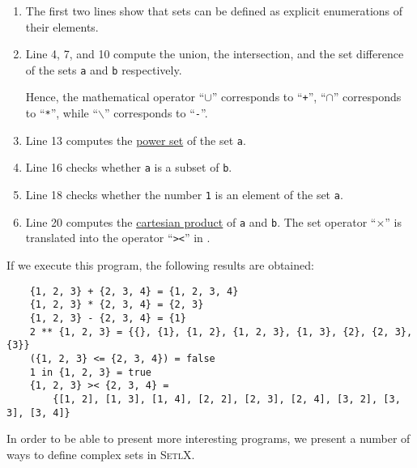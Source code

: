 \begin{enumerate}
\item The first two lines show that sets can be defined as explicit enumerations of their elements.
\item Line 4, 7, and 10 compute the union, the intersection, and the set difference of the sets
      \texttt{a} and \texttt{b} respectively.

      Hence, the mathematical operator ``$\cup$'' corresponds to ``\texttt{+}'', ``$\cap$''
      corresponds to ``\texttt{*}'', while ``$\backslash$'' corresponds to ``\texttt{-}''.
\item Line 13 computes the \href{https://en.wikipedia.org/wiki/Power_set}{power set} of the set
      \texttt{a}.
\item Line 16 checks whether \texttt{a} is a subset of \texttt{b}.
\item Line 18 checks whether the number \texttt{1} is an element of the set \texttt{a}.
\item Line 20 computes the \href{https://en.wikipedia.org/wiki/Cartesian_product}{cartesian product}
      of \texttt{a} and \texttt{b}.  The set operator ``$\times$'' is translated into the operator
      ``\texttt{><}'' in \setl.
\end{enumerate}
If we execute this program, the following results are obtained:
\begin{verbatim}
    {1, 2, 3} + {2, 3, 4} = {1, 2, 3, 4}
    {1, 2, 3} * {2, 3, 4} = {2, 3}
    {1, 2, 3} - {2, 3, 4} = {1}
    2 ** {1, 2, 3} = {{}, {1}, {1, 2}, {1, 2, 3}, {1, 3}, {2}, {2, 3}, {3}}
    ({1, 2, 3} <= {2, 3, 4}) = false
    1 in {1, 2, 3} = true
    {1, 2, 3} >< {2, 3, 4} = 
        {[1, 2], [1, 3], [1, 4], [2, 2], [2, 3], [2, 4], [3, 2], [3, 3], [3, 4]}

\end{verbatim}
In order to be able to present more interesting programs, we present a number of ways to define
complex sets in  \textsc{SetlX}.

